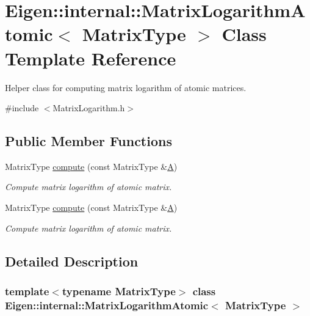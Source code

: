 \hypertarget{class_eigen_1_1internal_1_1_matrix_logarithm_atomic}{}\section{Eigen\+:\+:internal\+:\+:Matrix\+Logarithm\+Atomic$<$ Matrix\+Type $>$ Class Template Reference}
\label{class_eigen_1_1internal_1_1_matrix_logarithm_atomic}


Helper class for computing matrix logarithm of atomic matrices.  




{\ttfamily \#include $<$Matrix\+Logarithm.\+h$>$}

\subsection*{Public Member Functions}
\begin{DoxyCompactItemize}
\item 
Matrix\+Type \hyperlink{class_eigen_1_1internal_1_1_matrix_logarithm_atomic_a14d76ac8fb2bc662a9560a76f7df4fe7}{compute} (const Matrix\+Type \&\hyperlink{group___core___module_class_eigen_1_1_matrix}{A})
\begin{DoxyCompactList}\small\item\em Compute matrix logarithm of atomic matrix. \end{DoxyCompactList}\item 
Matrix\+Type \hyperlink{class_eigen_1_1internal_1_1_matrix_logarithm_atomic_a14d76ac8fb2bc662a9560a76f7df4fe7}{compute} (const Matrix\+Type \&\hyperlink{group___core___module_class_eigen_1_1_matrix}{A})
\begin{DoxyCompactList}\small\item\em Compute matrix logarithm of atomic matrix. \end{DoxyCompactList}\end{DoxyCompactItemize}


\subsection{Detailed Description}
\subsubsection*{template$<$typename Matrix\+Type$>$\newline
class Eigen\+::internal\+::\+Matrix\+Logarithm\+Atomic$<$ Matrix\+Type $>$}

